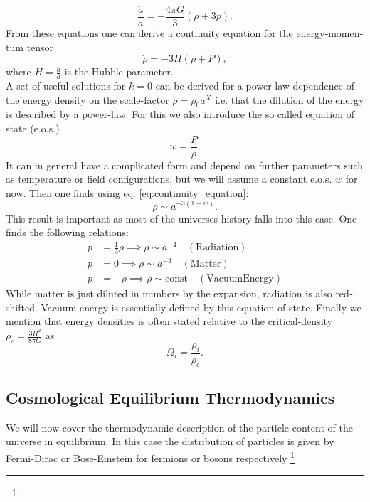 \documentclass[master,       %
               twoside,        %
               BCOR10mm,       %
               english,ngerman, %
               ]{GAUBM}
\begin{document}
\begin{otherlanguage}{english}
{}
\begin{equation}
	\frac{\ddot{a}}{a} = - \frac{4 \pi G}{3} ( \rho + 3 p ).
\end{equation}
From these equations one can derive a continuity equation for the energy-momentum tensor
\begin{equation}
	\label{eq:continuity_equation}
	\dot{\rho} = - 3 H (\rho + P),
\end{equation}
where $H = \frac{\dot{a}}{a}$ is the Hubble-parameter. \\
\noindent A set of useful solutions for $k = 0$ can be derived for a power-law dependence of the energy density on the scale-factor $\rho = \rho_0 a^X$ i.e. that the dilution of the energy is described by a power-law. For this we also introduce the so called equation of state (e.o.s.)
\begin{equation}
	w = \frac{P}{\rho}.
\end{equation}
It can in general have a complicated form and depend on further parameters such as temperature or field configurations, but we will assume a constant e.o.s. $w$ for now.
Then one finds using eq. \eqref{eq:continuity_equation}:
\begin{equation}
	\rho \sim a^{-3(1 + w)}.
\end{equation}
This result is important as most of the universes history falls into this case.
One finds the following relations:
\begin{align}
	p &= \frac{1}{3} \rho \implies \rho \sim a^{-4} \quad \mathrm{(Radiation)} \nonumber \\
	p &= 0 \implies \rho \sim a^{-3} \quad \mathrm{(Matter)} \nonumber \\
	p &= - \rho \implies \rho \sim \mathrm{const} \quad \mathrm{(Vacuum Energy)}
\end{align}
While matter is just diluted in numbers by the expansion, radiation is also redshifted.
Vacuum energy is essentially defined by this equation of state.
Finally we mention that energy densities is often stated relative to the critical-density $\rho_c = \frac{3 H^2}{8 \pi G}$ as
\begin{equation}
	\Omega_i = \frac{\rho_i}{\rho_c}.
\end{equation}

\subsection{Cosmological Equilibrium Thermodynamics}
We will now cover the thermodynamic description of the particle content of the universe
in equilibrium.
In this case the distribution of particles is given by Fermi-Dirac or Bose-Einstein for fermions or bosons respectively \footnote{

}
\end{otherlanguage}
\end{document}
